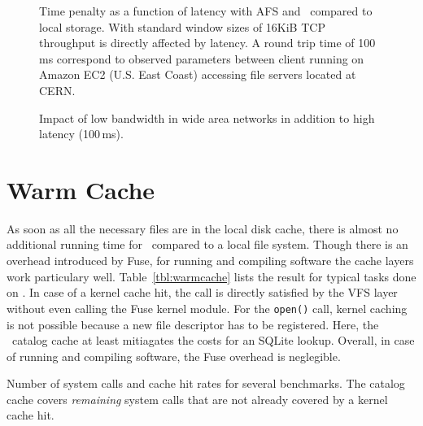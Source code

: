 \begin{figure}
	\begin{center}
		
	\end{center}
	\caption{Time penalty as a function of latency with {\scshape AFS} and \cvmfs\ compared to local storage. With standard window sizes of 16KiB TCP throughput is directly affected by latency. A round trip time of 100\,ms correspond to observed parameters between client running on Amazon EC2 (U.S. East Coast) accessing file servers located at CERN.}
	\label{fig:latency}
\end{figure}

\begin{figure}
	\begin{center}
		
	\end{center}
	\caption{Impact of low bandwidth in wide area networks in addition to high latency (100\,ms).}
	\label{fig:bandwidth}
\end{figure}

\section{Warm Cache}

As soon as all the necessary files are in the local disk cache, there is almost no additional running time for \cvmfs\ compared to a local file system.
Though there is an overhead introduced by Fuse, for running and compiling software the cache layers work particulary well.
Table~\ref{tbl:warmcache} lists the result for typical tasks done on \cvmfs.
In case of a kernel cache hit, the call is directly satisfied by the VFS layer without even calling the Fuse kernel module.
For the \texttt{open()} call, kernel caching is not possible because a new file descriptor has to be registered.
Here, the \cvmfs\ catalog cache at least mitiagates the costs for an SQLite lookup.
Overall, in case of running and compiling software, the Fuse overhead is neglegible.

\begin{table}
	\begin{center}
		
	\end{center}
	\caption{Number of system calls and cache hit rates for several benchmarks. The catalog cache covers \emph{remaining} system calls that are not already covered by a kernel cache hit.}
	\label{tbl:warmcache}
\end{table}
